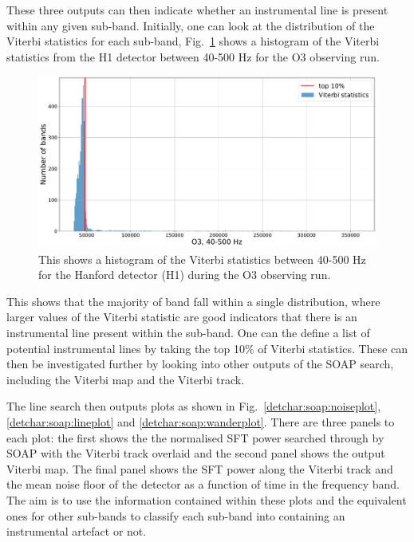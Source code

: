 These three outputs can then indicate whether an instrumental line is present within any given sub-band.
Initially, one can look at the distribution of the Viterbi statistics for each sub-band, Fig.~\ref{detchar:soap:rankedstats} shows a histogram of the Viterbi statistics from the H1 detector between 40-500 Hz for the O3 observing run.
%
\begin{figure}[ht]
	\centering
	\includegraphics[width=\textwidth]{C6_detchar/statistic_hists_O3_H1.pdf}
	\caption[Viterbi statistics for H1 in O3, 40-500 Hz]{This shows a histogram of the Viterbi statistics between 40-500 Hz for the Hanford detector (H1) during the O3 observing run. }
	\label{detchar:soap:rankedstats}
\end{figure}
%
This shows that the majority of band fall within a single distribution, where larger values of the Viterbi statistic are good indicators that there is an instrumental line present within the sub-band.
One can the define a list of potential instrumental lines by taking the top 10\% of Viterbi statistics. 
These can then be investigated further by looking into other outputs of the SOAP search, including the Viterbi map and the Viterbi track.

%
The line search then outputs plots as shown in Fig.~\ref{detchar:soap:noiseplot}, \ref{detchar:soap:lineplot} and
\ref{detchar:soap:wanderplot}. 
There are three panels to each plot: the first shows the the normalised \gls{SFT} power searched through by SOAP with the Viterbi track overlaid and the second panel shows the output Viterbi map.
The final panel shows the \gls{SFT} power along the Viterbi track and the mean noise floor of the detector as a function of time in the frequency band.  
The aim is to use the information contained within these plots and the equivalent ones for other sub-bands to classify each sub-band into containing an instrumental artefact or not. 

